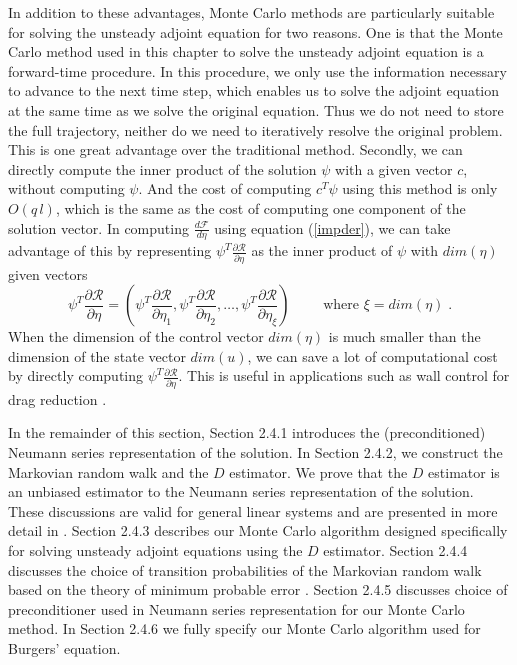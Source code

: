     In addition to these advantages, Monte Carlo methods are
    particularly suitable for solving the unsteady adjoint equation for
    two reasons.  One is that the Monte Carlo method used in this chapter
    to solve the unsteady adjoint equation is a forward-time procedure.
    In this procedure, we only use the information necessary to
    advance to the next time step, which enables us to solve the adjoint
    equation at the same time as we solve the original equation.  Thus we
    do not need to store the full trajectory, neither do we need to
    iteratively resolve the original problem.  This is one great
    advantage over the traditional method.  Secondly, we can directly
    compute the inner product of the solution $\psi$ with a given vector
    $c$, without computing $\psi$.  And the cost of computing $c^T \psi$
    using this method is only $O(q\,l)$, which is the same as the cost of
    computing one component of the solution vector.  In computing
    $\frac{d\mathcal{F}}{d\eta}$ using equation (\ref{impder}), we can take
    advantage of this by representing $\psi^T \frac{\partial
    \mathcal{R}}{\partial \eta}$ as the inner product of $\psi$ with
    $dim(\eta)$ given vectors
    \[ \psi^T \frac{\partial \mathcal{R}}{\partial \eta}
        = \left( \psi^T \frac{\partial \mathcal{R}}{\partial \eta_1},
                 \psi^T \frac{\partial \mathcal{R}}{\partial \eta_2}, \ldots,
                 \psi^T \frac{\partial \mathcal{R}}{\partial \eta_\xi}
          \right) \qquad \mbox{ where } \xi = dim(\eta) \;.
    \]
    When the dimension of the control vector $dim(\eta)$ is much smaller than
    the dimension of the state vector $dim(u)$, we can save a lot of
    computational cost by directly computing
    $\psi^T \frac{\partial \mathcal{R}}{\partial \eta}$.
    This is useful in applications such as wall control for drag reduction
    \cite[]{Choi1993} \cite[]{bewley01}.
    
    In the remainder of this section, Section 2.4.1 introduces the
    (preconditioned) Neumann series representation of the solution.
    In Section 2.4.2, we construct the Markovian random walk and the $D$
    estimator.  We prove that the $D$ estimator is an unbiased estimator
    to the Neumann series representation of the solution.  These discussions
    are valid for general linear systems and are presented in more detail in
    \cite[]{Okten2005}.  Section 2.4.3 describes our Monte Carlo algorithm
    designed specifically for solving unsteady adjoint equations using
    the $D$ estimator.  Section 2.4.4 discusses the choice of transition
    probabilities of the Markovian random walk based on the theory of
    minimum probable error \cite[]{Dimov1991}.  Section 2.4.5 discusses choice
    of preconditioner used in Neumann series representation for our
    Monte Carlo method.  In Section 2.4.6 we fully specify our
    Monte Carlo algorithm used for Burgers' equation.
    


